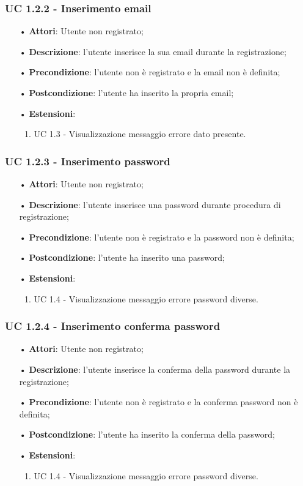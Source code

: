 \subsubsection{UC 1.2.2 - Inserimento email}
\begin{itemize}
	\item[•]\textbf{Attori}: Utente non registrato;
	\item[•]\textbf{Descrizione}: l'utente inserisce la sua email durante la registrazione;
	\item[•]\textbf{Precondizione}: l'utente non è registrato e la email non è definita;
	\item[•]\textbf{Postcondizione}: l'utente ha inserito la propria email;
	\item[•] \textbf{Estensioni}:
		\begin{enumerate}
		\item UC 1.3 - Visualizzazione messaggio errore dato presente.
	\end{enumerate}
\end{itemize}

\subsubsection{UC 1.2.3 - Inserimento password}
\begin{itemize}
	\item[•]\textbf{Attori}: Utente non registrato;
	\item[•]\textbf{Descrizione}: l'utente inserisce una password durante procedura di registrazione;
	\item[•]\textbf{Precondizione}: l'utente non è registrato e la password non è definita;
	\item[•]\textbf{Postcondizione}: l'utente ha inserito una password;
	\item[•] \textbf{Estensioni}:
	\begin{enumerate}
		\item UC 1.4 - Visualizzazione messaggio errore password diverse.
	\end{enumerate}
\end{itemize}

\subsubsection{UC 1.2.4 - Inserimento conferma password}
\begin{itemize}
	\item[•]\textbf{Attori}: Utente non registrato;
	\item[•]\textbf{Descrizione}: l'utente inserisce la conferma della password durante la registrazione;
	\item[•]\textbf{Precondizione}: l'utente non è registrato e la conferma password non è definita;
	\item[•]\textbf{Postcondizione}: l'utente ha inserito la conferma della password;
	\item[•] \textbf{Estensioni}:
		\begin{enumerate}
		\item UC 1.4 - Visualizzazione messaggio errore password diverse.
	\end{enumerate}
\end{itemize}

